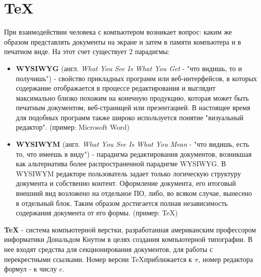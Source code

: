 \section{\TeX}
При взаимодействии человека с компьютером возникает вопрос: каким же образом представлять документы на экране и затем в памяти компьютера и в печатном виде. На этот счет существует 2 парадигмы:
\begin{itemize}
\item \textbf{WYSIWYG} (англ. \emph{What You See Is What You Get} - "что видишь, то и получишь") - свойство прикладных программ или веб-интерфейсов, в которых содержание отображается в процессе редактирования и выглядит максимально близко похожим на конечную продукцию, которая может быть печатным документом, веб-страницей или презентацией. В настоящее время для подобных программ также широко используется понятие "визуальный редактор". (пример: Microsoft Word)
\item \textbf{WYSIWYM} (англ. \emph{What You See Is What You Mean} - "что видишь, есть то, что имеешь в виду") - парадигма редактирования документов, возникшая как альтернатива более распространенной парадигме WYSIWYG. В WYSIWYM редакторе пользователь задает только логическую структуру документа и собственно контент. Оформление документа, его итоговый внешний вид возложено на отдельное ПО, либо, во всяком случае, вынесено в отдельный блок. Таким образом достигается полная независимость содержания документа
от его формы. (пример: \TeX)
\end{itemize}
\textbf{\TeX} - система компьютерной верстки, разработанная американским профессором информатики Дональдом Кнутом в целях создания компьютерной типографии. В нее входят средства для секционирования документов, для работы с перекрестными ссылками. Номер версии \TeX приближается к $\pi$, номер редактора формул - к числу $e$.
